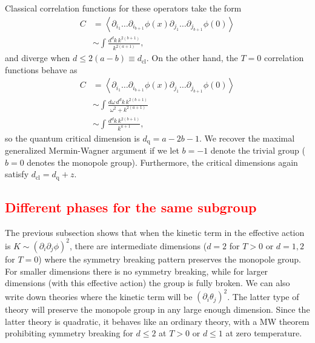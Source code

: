 \documentclass[pra,aps,twocolumn, amsfonts,amsmath,amssymb,nofootinbib,superscriptaddress]{revtex4-2}
\newcommand{\note}[1]{\textcolor{red}{#1}}
\newcommand{\nn}{\nonumber\\}
\newcommand{\cl}{\text{cl}}
\begin{document}
Classical correlation functions for these operators take the form
\begin{align}
C &= \left\langle \partial_{i_1} \dots \partial_{i_{b+1}} \phi(x) \partial_{j_1} \dots \partial_{j_{b+1}} \phi(0) \right\rangle \nn
&\sim \int \frac{d^dk\, k^{2(b+1)}}{k^{2(a+1)}},
\end{align}
and diverge when $d \le 2(a-b)\equiv d_\text{cl}$. On the other hand, the $T=0$ correlation functions behave as
\begin{align}
C &= \left\langle \partial_{i_1} \dots \partial_{i_{b+1}} \phi(x) \partial_{j_1} \dots \partial_{j_{b+1}} \phi(0) \right\rangle \nn
&\sim \int \frac{d\omega\, d^dk\, k^{2({b+1})}}{\omega^2 + k^{2(a+1)}}\nn
&\sim \int \frac{d^dk\, k^{2(b+1)}}{k^{a+1}},
\end{align}
so the quantum critical dimension is $d_\text{q} = a - 2b - 1$. We recover the maximal generalized Mermin-Wagner argument if we let $b=-1$ denote the trivial group ($b=0$ denotes the monopole group). Furthermore, the critical dimensions again satisfy $d_\cl = d_\text{q} + z$.



\subsection{\note{Different phases for the same subgroup}} \label{sub:phases}

The previous subsection shows that when the kinetic term in the effective action is $K\sim (\partial_i\partial_j\phi)^2$, there are intermediate dimensions ($d=2$ for $T>0$ or $d=1,2$ for $T=0$) where the symmetry breaking pattern preserves the monopole group. For smaller dimensions there is no symmetry breaking, while for larger dimensions (with this effective action) the group is fully broken.
We can also write down theories where the kinetic term will be $(\partial_i\theta_j)^2$. The latter type of theory will preserve the monopole group in any large enough dimension. Since the latter theory is quadratic, it behaves like an ordinary theory, with a MW theorem prohibiting symmetry breaking for $d\le 2$ at $T>0$ or $d\le 1$ at zero temperature.
\end{document}

